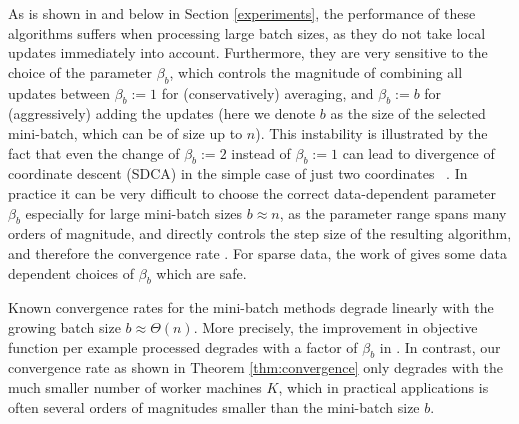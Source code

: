 \documentclass{article} %
\begin{document}
As is shown in \cite{Yang:2013vl} and below in Section \ref{experiments}, the performance of these algorithms suffers when processing large batch sizes, as they do not take local updates immediately into account. Furthermore, they are very
sensitive to the choice of the parameter $\beta_b$, which controls the
magnitude of combining all updates between $\beta_b:=1$ for (conservatively) averaging,
and $\beta_b:=b$ for (aggressively) adding the updates (here we denote $b$ as
the size of the selected mini-batch, which can be of size up to $n$). 
This instability is illustrated by the fact that even the change of
 $\beta_b:=2$ instead of $\beta_b:=1$ can lead to divergence of 
coordinate descent (SDCA) in the simple case of just two
coordinates~\cite{Takac:2013ut}
.
In practice it can be very difficult to choose the correct data-dependent parameter
$\beta_b$ especially for large mini-batch sizes $b\approx n$, as the parameter
range spans many orders of magnitude, and directly controls the step size of the resulting algorithm, and therefore the convergence
rate \cite{Richtarik:2013us,Fercoq:2014ut}%
.
For sparse data, the work of \cite{Richtarik:2013us,Fercoq:2014ut} gives 
some data dependent choices of $\beta_b$ which are safe.

Known convergence rates for the mini-batch methods %
degrade linearly with the growing batch size $b\approx \Theta(n)$. More precisely, the improvement in objective function per example processed degrades with a factor of $\beta_b$ in \cite{Takac:2013ut,Richtarik:2013us,Fercoq:2014ut}.
In contrast, our convergence rate as shown in Theorem \ref{thm:convergence} 
only degrades with the much smaller number of worker machines $K$, which 
in practical applications is often several orders of magnitudes smaller than the mini-batch size $b$.

\end{document}
